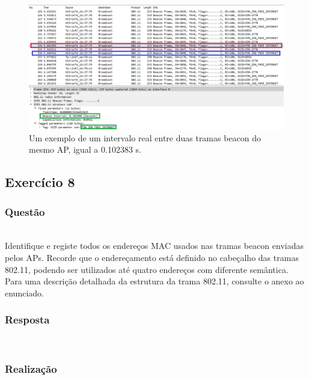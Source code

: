 \documentclass{llncs}
\begin{document}
\begin{figure}
  \begin{center}
  \includegraphics[scale=0.35]{imagens/FONZON_BI.png} 
  \end{center}
  \caption{Um exemplo de um intervalo real entre duas tramas beacon do mesmo AP, igual a 0.102383 s.}
  \label{fig:zon_interval}
\end{figure}


\clearpage
\subsection{Exercício 8}
\subsubsection{Questão}\rule[-10pt]{0pt}{10pt}\\

Identifique e registe todos os endereços MAC usados nas tramas beacon enviadas pelos APs. Recorde que o endereçamento está definido no cabeçalho das tramas 802.11, podendo ser utilizados até quatro endereços com diferente semântica. Para uma descrição detalhada da estrutura da trama 802.11, consulte o anexo ao enunciado.

\subsubsection{Resposta}\rule[-10pt]{0pt}{10pt}\\



\subsubsection{Realização}\rule[-10pt]{0pt}{10pt}\\



\clearpage
\end{document}
